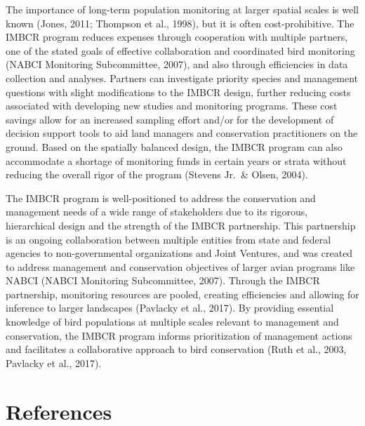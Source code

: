 \documentclass[
  letterpaper,
  DIV=11,
  numbers=noendperiod,
  oneside]{scrreprt}
\newlength{\cslhangindent}
\newlength{\cslentryspacingunit} %
\newenvironment{CSLReferences}[2] %
 {%
  \setlength{\parindent}{0pt}
  \ifodd #1
  \let\oldpar\par
  \def\par{\hangindent=\cslhangindent\oldpar}
  \fi
  \setlength{\parskip}{#2\cslentryspacingunit}
 }%
 {}
\begin{document}
The importance of long-term population monitoring at larger spatial
scales is well known (Jones, 2011; Thompson et al., 1998), but it is
often cost-prohibitive. The IMBCR program reduces expenses through
cooperation with multiple partners, one of the stated goals of effective
collaboration and coordinated bird monitoring (NABCI Monitoring
Subcommittee, 2007), and also through efficiencies in data collection
and analyses. Partners can investigate priority species and management
questions with slight modifications to the IMBCR design, further
reducing costs associated with developing new studies and monitoring
programs. These cost savings allow for an increased sampling effort
and/or for the development of decision support tools to aid land
managers and conservation practitioners on the ground. Based on the
spatially balanced design, the IMBCR program can also accommodate a
shortage of monitoring funds in certain years or strata without reducing
the overall rigor of the program (Stevens Jr.~\& Olsen, 2004).

The IMBCR program is well-positioned to address the conservation and
management needs of a wide range of stakeholders due to its rigorous,
hierarchical design and the strength of the IMBCR partnership. This
partnership is an ongoing collaboration between multiple entities from
state and federal agencies to non-governmental organizations and Joint
Ventures, and was created to address management and conservation
objectives of larger avian programs like NABCI (NABCI Monitoring
Subcommittee, 2007). Through the IMBCR partnership, monitoring resources
are pooled, creating efficiencies and allowing for inference to larger
landscapes (Pavlacky et al., 2017). By providing essential knowledge of
bird populations at multiple scales relevant to management and
conservation, the IMBCR program informs prioritization of management
actions and facilitates a collaborative approach to bird conservation
(Ruth et al., 2003, Pavlacky et al., 2017).


\hypertarget{references}{%
\chapter*{References}\label{references}}


\hypertarget{refs}{}
\begin{CSLReferences}{0}{0}
\end{CSLReferences}
\end{document}
